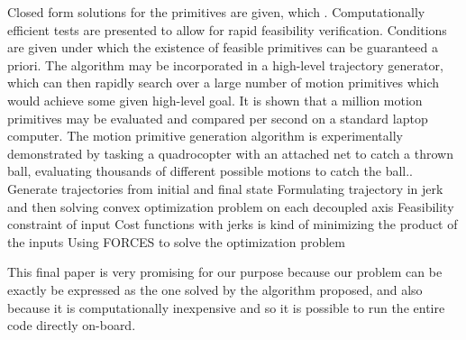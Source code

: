Closed form solutions for the primitives are given, which . Computationally
efficient tests are presented to allow for rapid feasibility verification.
Conditions are given under which the existence of feasible
primitives can be guaranteed a priori. The algorithm may be
incorporated in a high-level trajectory generator, which can then
rapidly search over a large number of motion primitives which
would achieve some given high-level goal. It is shown that a
million motion primitives may be evaluated and compared per
second on a standard laptop computer. The motion primitive
generation algorithm is experimentally demonstrated by tasking
a quadrocopter with an attached net to catch a thrown ball,
evaluating thousands of different possible motions to catch the
ball..\\

Generate trajectories from initial and final state
Formulating trajectory in jerk and then solving convex optimization problem on each decoupled axis
Feasibility constraint of input 
Cost functions with jerks is kind of minimizing the product of the inputs
Using FORCES to solve the optimization problem




This final paper is very promising for our purpose because our problem can be exactly be expressed as the one solved by the algorithm proposed, and also because it is computationally inexpensive and so it is possible to run the entire code directly on-board.



